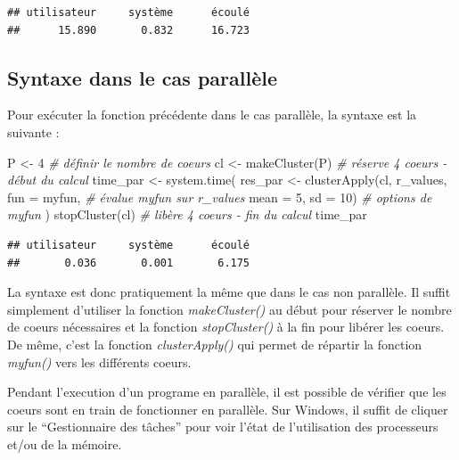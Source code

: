 \documentclass[
]{book}
\newenvironment{Shaded}{\begin{snugshade}}{\end{snugshade}}
\newcommand{\AttributeTok}[1]{\textcolor[rgb]{0.77,0.63,0.00}{#1}}
\newcommand{\CommentTok}[1]{\textcolor[rgb]{0.56,0.35,0.01}{\textit{#1}}}
\newcommand{\DecValTok}[1]{\textcolor[rgb]{0.00,0.00,0.81}{#1}}
\newcommand{\FunctionTok}[1]{\textcolor[rgb]{0.00,0.00,0.00}{#1}}
\newcommand{\NormalTok}[1]{#1}
\newcommand{\OtherTok}[1]{\textcolor[rgb]{0.56,0.35,0.01}{#1}}
\theoremstyle{definition}
\theoremstyle{definition}
\theoremstyle{definition}
\theoremstyle{definition}
\theoremstyle{remark}
\begin{document}
\begin{verbatim}
## utilisateur     système      écoulé 
##      15.890       0.832      16.723
\end{verbatim}

\hypertarget{syntaxe-dans-le-cas-paralluxe8le}{%
\subsection{Syntaxe dans le cas parallèle}\label{syntaxe-dans-le-cas-paralluxe8le}}

Pour exécuter la fonction précédente dans le cas parallèle, la syntaxe est la suivante :

\begin{Shaded}
\begin{Highlighting}[]
\NormalTok{P }\OtherTok{\textless{}{-}} \DecValTok{4}  \CommentTok{\# définir le nombre de coeurs }
\NormalTok{cl }\OtherTok{\textless{}{-}} \FunctionTok{makeCluster}\NormalTok{(P) }\CommentTok{\# réserve 4 coeurs {-} début du calcul }
\NormalTok{time\_par }\OtherTok{\textless{}{-}} \FunctionTok{system.time}\NormalTok{(}
\NormalTok{ res\_par }\OtherTok{\textless{}{-}} \FunctionTok{clusterApply}\NormalTok{(cl, r\_values, }\AttributeTok{fun =}\NormalTok{ myfun, }\CommentTok{\# évalue myfun sur r\_values  }
                   \AttributeTok{mean =} \DecValTok{5}\NormalTok{, }\AttributeTok{sd =} \DecValTok{10}\NormalTok{)  }\CommentTok{\# options de myfun}
\NormalTok{)  }
\FunctionTok{stopCluster}\NormalTok{(cl) }\CommentTok{\# libère 4 coeurs {-} fin du calcul }
\NormalTok{time\_par}
\end{Highlighting}
\end{Shaded}

\begin{verbatim}
## utilisateur     système      écoulé 
##       0.036       0.001       6.175
\end{verbatim}

La syntaxe est donc pratiquement la même que dans le cas non parallèle. Il suffit simplement d'utiliser la fonction \emph{makeCluster()} au début pour réserver le nombre de coeurs nécessaires et la fonction \emph{stopCluster()} à la fin pour libérer les coeurs. De même, c'est la fonction \emph{clusterApply()} qui permet de répartir la fonction \emph{myfun()} vers les différents coeurs.

Pendant l'execution d'un programe en parallèle, il est possible de vérifier que les coeurs sont en train de fonctionner en parallèle. Sur Windows, il suffit de cliquer sur le ``Gestionnaire des tâches'' pour voir l'état de l'utilisation des processeurs et/ou de la mémoire.
\end{document}
